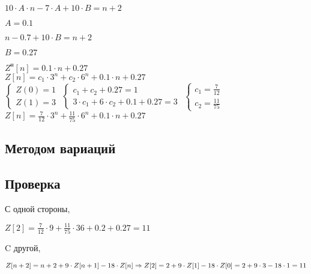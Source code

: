 $10 \cdot A \cdot n - 7 \cdot A + 10 \cdot B = n + 2$

\underline{$A = 0.1$}

$n - 0.7 + 10 \cdot B = n + 2$

\underline{$B = 0.27$}

$Z^{\text{н}}[n] = 0.1 \cdot n + 0.27$\\[0.3cm]

$Z[n] = c_1 \cdot 3^n + c_2 \cdot 6^n +0.1 \cdot n + 0.27$\\[0.3cm]

$
 \begin{cases}
   Z(0) = 1
   \\
   Z(1) = 3
 \end{cases}
$
$
 \begin{cases}
  c_1 + c_2 + 0.27 = 1
   \\
   3 \cdot c_1 + 6 \cdot c_2 + 0.1 + 0.27 = 3
 \end{cases}
$
$
 \begin{cases}
  c_1 = \frac{7}{12}
   \\
   c_2 = \frac{11}{75}
 \end{cases}
$\\[0.5cm]

$Z[n] = \frac{7}{12} \cdot 3^n + \frac{11}{75} \cdot 6^n + 0.1 \cdot n + 0.27$\\[0.5cm]
 

\subsection{Методом вариаций}

\subsection{Проверка}

С одной стороны,

 $Z[2] =  \frac{7}{12} \cdot 9 + \frac{11}{75} \cdot 36 + 0.2 + 0.27 = 11$

C другой,

 $Z[n+2] = n + 2 + 9 \cdot Z[n+1] - 18 \cdot Z[n] \Rightarrow \\ Z[2] = 2 + 9 \cdot Z[1] - 18 \cdot Z[0] = 2 + 9 \cdot 3 - 18 \cdot 1 = 11$


